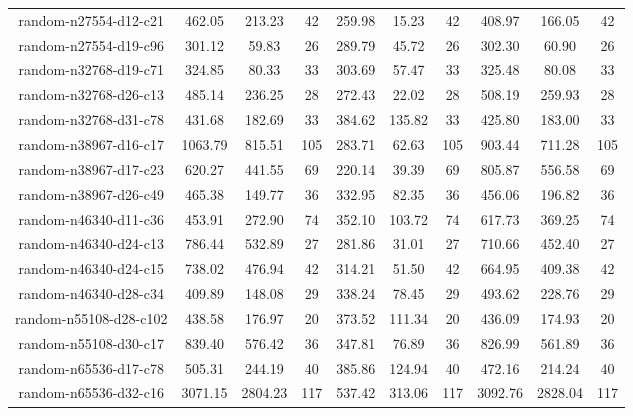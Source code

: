 \documentclass[letterpaper,12pt]{article}
\theoremstyle{remark}
\begin{document}
\begin{table}[ht]
\begin{tabular}{|c|c|c|c|c|c|c|c|c|c|}
random-n27554-d12-c21& 462.05 & 213.23& 42 & 259.98 & 15.23& 42 & 408.97 & 166.05& 42 \\
random-n27554-d19-c96& 301.12 & 59.83 & 26 & 289.79 & 45.72& 26 & 302.30 & 60.90 & 26 \\
random-n32768-d19-c71& 324.85 & 80.33 & 33 & 303.69 & 57.47& 33 & 325.48 & 80.08 & 33 \\
random-n32768-d26-c13& 485.14 & 236.25& 28 & 272.43 & 22.02& 28 & 508.19 & 259.93& 28 \\
random-n32768-d31-c78& 431.68 & 182.69& 33 & 384.62 & 135.82& 33 & 425.80 & 183.00& 33 \\
random-n38967-d16-c17& 1063.79& 815.51& 105& 283.71 & 62.63& 105& 903.44 & 711.28& 105 \\
random-n38967-d17-c23& 620.27 & 441.55& 69 & 220.14 & 39.39& 69 & 805.87 & 556.58& 69  \\
random-n38967-d26-c49& 465.38 & 149.77& 36 & 332.95 & 82.35& 36 & 456.06 & 196.82& 36  \\
random-n46340-d11-c36& 453.91 & 272.90& 74 & 352.10 & 103.72& 74 & 617.73 & 369.25& 74  \\
random-n46340-d24-c13& 786.44 & 532.89& 27 & 281.86 & 31.01& 27 & 710.66 & 452.40& 27  \\
random-n46340-d24-c15& 738.02 & 476.94& 42 & 314.21 & 51.50& 42 & 664.95 & 409.38& 42  \\
random-n46340-d28-c34& 409.89 & 148.08& 29 & 338.24 & 78.45& 29 & 493.62 & 228.76& 29  \\
random-n55108-d28-c102& 438.58 & 176.97& 20 & 373.52 & 111.34& 20 & 436.09 & 174.93& 20  \\
random-n55108-d30-c17 & 839.40 & 576.42& 36 & 347.81 & 76.89& 36 & 826.99 & 561.89& 36  \\
random-n65536-d17-c78 & 505.31 & 244.19& 40 & 385.86 & 124.94& 40 & 472.16 & 214.24& 40  \\
random-n65536-d32-c16 & 3071.15& 2804.23&117 & 537.42 & 313.06&117 & 3092.76& 2828.04&117 \\
\hline

\end{tabular}
\end{table}


\clearpage
\end{document}
